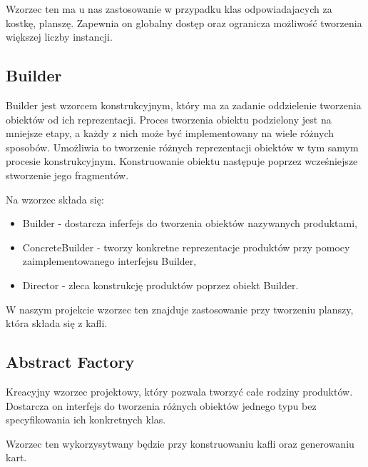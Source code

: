 \documentclass[a4paper, 11pt]{article}
\begin{document}
	Wzorzec ten ma u nas zastosowanie w przypadku klas odpowiadajacych za kostkę, planszę. Zapewnia on globalny dostęp oraz ogranicza możliwość tworzenia większej liczby instancji. 
	
	\subsection{Builder}
	\indent
	
	Builder jest wzorcem konstrukcyjnym, który ma za zadanie oddzielenie tworzenia obiektów od ich reprezentacji. 
	Proces tworzenia obiektu podzielony jest na mniejsze etapy, a każdy z nich może być implementowany na wiele różnych sposobów. Umożliwia to tworzenie różnych reprezentacji obiektów w tym samym procesie konstrukcyjnym.
	Konstruowanie obiektu następuje poprzez wcześniejsze stworzenie jego fragmentów.
	
	
	Na wzorzec składa się:
	\begin{itemize}
		
		\item Builder - dostarcza inferfejs do tworzenia obiektów nazywanych produktami,
		\item ConcreteBuilder - tworzy konkretne reprezentacje produktów przy pomocy zaimplementowanego interfejsu Builder,
		\item Director - zleca konstrukcję produktów poprzez obiekt Builder.
	\end{itemize}
	
	W naszym projekcie wzorzec ten znajduje zastosowanie przy tworzeniu planszy, która składa się z kafli.
	
	
	\subsection{Abstract Factory}
	\indent
	
	Kreacyjny wzorzec projektowy, który pozwala tworzyć całe rodziny produktów. Dostarcza on interfejs do tworzenia różnych obiektów jednego typu bez specyfikowania ich konkretnych klas.
	
	Wzorzec ten wykorzysytwany będzie przy konstruowaniu kafli oraz generowaniu kart.
	
	
\end{document}
